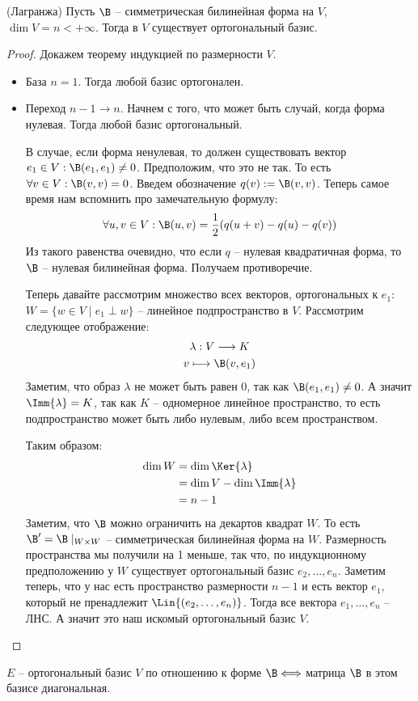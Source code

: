 \begin{theorem}
    (Лагранжа) Пусть $\B$ -- симметрическая билинейная форма на $V$, $\dim V = n < + \infty$. Тогда в $V$ существует ортогональный
    базис.
\end{theorem}
\begin{proof}
    Докажем теорему индукцией по размерности $V$. 
    \begin{itemize}
        \item База $n = 1$. Тогда любой базис ортогонален. 
        \item Переход $n-1 \to n$. Начнем с того, что может быть случай, когда форма нулевая. Тогда любой базис ортогональный. 
        
        В случае, если форма ненулевая, то должен существовать вектор $e_1 \in V : \B(e_1, e_1) \neq 0$. Предположим, что это не так. 
        То есть $\forall v \in V : \B(v, v) = 0$. Введем обозначение $q(v) := \B(v, v)$. Теперь самое время нам вспомнить про замечательную формулу: 
        \begin{gather*}
            \forall u, v \in V : \B(u, v) = \frac{1}{2} (q(u+v) - q(u) - q(v))
        \end{gather*}
        Из такого равенства очевидно, что если $q$ -- нулевая квадратичная форма, то $\B$ -- нулевая билинейная форма. Получаем противоречие.

        Теперь давайте рассмотрим множество всех векторов, ортогональных к $e_1$: $W = \{ w \in V \mid e_1 \perp w \}$ -- линейное подпространство в $V$. 
        Рассмотрим следующее отображение: 
        \begin{gather*}
            \lambda: V \longrightarrow K \\
            v \longmapsto \B(v, e_1)
        \end{gather*}
        Заметим, что образ $\lambda$ не может быть равен 0, так как $\B(e_1, e_1) \neq 0$. А значит $\Imm{\lambda} = K$, так как $K$ -- одномерное линейное пространство, то есть 
        подпространство может быть либо нулевым, либо всем пространством. 

        Таким образом:
        \begin{align*}
            \dim{W} &= \dim{\Ker{\lambda}} \\
            &= \dim{V} - \dim{\Imm{\lambda}} \\
            &= n - 1
        \end{align*}
        Заметим, что $\B$ можно ограничить на декартов квадрат $W$. То есть $\B' = \B \mid_{W \times W}$ -- симметрическая билинейная форма на $W$. Размерность пространства мы получили 
        на 1 меньше, так что, по индукционному предположению у 
        $W$ существует ортогональный базис $e_2, \dots, e_n$. Заметим теперь, что у нас есть пространство размерности $n-1$ и есть вектор $e_1$, который не пренадлежит $\Lin{(e_2, \dots, e_n)}$. Тогда все 
        вектора $e_1, \dots, e_n$ -- ЛНС. А значит это наш искомый ортогональный базис $V$. 
    \end{itemize}
\end{proof}    
\notice $E$ -- ортогональный базис $V$ по отношению к форме $\B \Longleftrightarrow$ матрица $\B$ в этом базисе диагональная.

